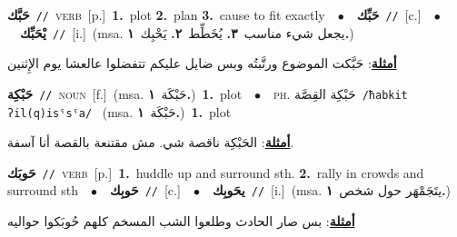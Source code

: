 \documentclass[10pt,a4paper,twoside]{article} %
\begin{document}
\begin{multicols}{2}
{\setlength\topsep{0pt}\textbf{\foreignlanguage{arabic}{حَبَّك}}\ {\color{gray}\texttt{//}\color{black}}\ \textsc{verb}\ [p.]\ \textbf{1.}~plot  \textbf{2.}~plan  \textbf{3.}~cause to fit exactly\ \ $\bullet$\ \ \setlength\topsep{0pt}\textbf{\foreignlanguage{arabic}{حَبِّك}}\ {\color{gray}\texttt{//}\color{black}}\ [c.]\ \ $\bullet$\ \ \setlength\topsep{0pt}\textbf{\foreignlanguage{arabic}{يْحَبِّك}}\ {\color{gray}\texttt{//}\color{black}}\ [i.]\ \color{gray}(msa. \foreignlanguage{arabic}{يجعل شيء مناسب}~\foreignlanguage{arabic}{\textbf{٣.}}  \foreignlanguage{arabic}{يُخَطِّط}~\foreignlanguage{arabic}{\textbf{٢.}}  \foreignlanguage{arabic}{يَحْبِك}~\foreignlanguage{arabic}{\textbf{١.}})\color{black}\  \begin{flushright}\color{gray}\foreignlanguage{arabic}{\textbf{\underline{\foreignlanguage{arabic}{أمثلة}}}: حَبَّكت الموضوع ورتَّبتُه وبس ضايل عليكم تتفضلوا عالعشا يوم الإِثنين}\end{flushright}\color{black}} \vspace{2mm}

{\setlength\topsep{0pt}\textbf{\foreignlanguage{arabic}{حَبْكِة}}\ {\color{gray}\texttt{//}\color{black}}\ \textsc{noun}\ [f.]\ \color{gray}(msa. \foreignlanguage{arabic}{حَبْكَة}~\foreignlanguage{arabic}{\textbf{١.}})\color{black}\ \textbf{1.}~plot\ \ $\bullet$\ \ \textsc{ph.} \color{gray} \foreignlanguage{arabic}{حَبْكِة القِصَّة}\color{black}\ {\color{gray}\texttt{/{\sffamily ħabkit ʔil(q)isˤsˤa}/}\color{black}}\ \color{gray} (msa. \foreignlanguage{arabic}{حَبْكَة}~\foreignlanguage{arabic}{\textbf{١.}})\color{black}\ \textbf{1.}~plot\  \begin{flushright}\color{gray}\foreignlanguage{arabic}{\textbf{\underline{\foreignlanguage{arabic}{أمثلة}}}: الحَبْكِة ناقصة شي. مش مقتنعة بالقصة أنا آسفة.}\end{flushright}\color{black}} \vspace{2mm}

{\setlength\topsep{0pt}\textbf{\foreignlanguage{arabic}{حَوبَك}}\ {\color{gray}\texttt{//}\color{black}}\ \textsc{verb}\ [p.]\ \textbf{1.}~huddle up and surround sth.  \textbf{2.}~rally in crowds and surround sth\ \ $\bullet$\ \ \setlength\topsep{0pt}\textbf{\foreignlanguage{arabic}{حَوبِك}}\ {\color{gray}\texttt{//}\color{black}}\ [c.]\ \ $\bullet$\ \ \setlength\topsep{0pt}\textbf{\foreignlanguage{arabic}{يحَوبِك}}\ {\color{gray}\texttt{//}\color{black}}\ [i.]\ \color{gray}(msa. \foreignlanguage{arabic}{يتَجَمْهَر حول شخص}~\foreignlanguage{arabic}{\textbf{١.}})\color{black}\  \begin{flushright}\color{gray}\foreignlanguage{arabic}{\textbf{\underline{\foreignlanguage{arabic}{أمثلة}}}: بس صار الحادث وطلعوا الشب المسخم كلهم حُوبَكوا حواليه}\end{flushright}\color{black}} \vspace{2mm}


\end{multicols}
\end{document}
